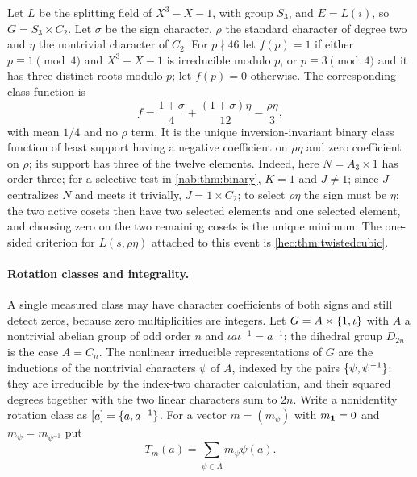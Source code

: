 \begin{example}\label{nab:ex:twisted}
Let $L$ be the splitting field of $X^3-X-1$, with group $S_3$, and $E=L(i)$, so
$G=S_3\times C_2$. Let $\sigma$ be the sign character, $\rho$ the standard character of
degree two and $\eta$ the nontrivial character of $C_2$. For $p\nmid46$ let $f(p)=1$ if
either $p\equiv1\pmod4$ and $X^3-X-1$ is irreducible modulo $p$, or $p\equiv3\pmod4$ and it
has three distinct roots modulo $p$; let $f(p)=0$ otherwise. The corresponding class
function is
\[
 f=\frac{1+\sigma}4+\frac{(1+\sigma)\eta}{12}-\frac{\rho\eta}3 ,
\]
with mean $1/4$ and no $\rho$ term. It is the unique inversion-invariant binary class
function of least support having a negative coefficient on $\rho\eta$ and zero coefficient
on $\rho$; its support has three of the twelve elements. Indeed, here $N=A_3\times1$ has
order three; for a selective test in \cref{nab:thm:binary}, $K=1$ and $J\ne1$; since $J$
centralizes $N$ and meets it trivially, $J=1\times C_2$; to select $\rho\eta$ the sign must
be $\eta$; the two active cosets then have two selected elements and one selected element,
and choosing zero on the two remaining cosets is the unique minimum. The one-sided
criterion for $L(s,\rho\eta)$ attached to this event is \cref{hec:thm:twistedcubic}.
\end{example}

\paragraph{Rotation classes and integrality.}
A single measured class may have character coefficients of both signs and still detect
zeros, because zero multiplicities are integers. Let $G=A\rtimes\{1,\iota\}$ with $A$ a
nontrivial abelian group of odd order $n$ and $\iota a\iota^{-1}=a^{-1}$; the dihedral
group $D_{2n}$ is the case $A=C_n$. The nonlinear irreducible representations of $G$ are
the inductions of the nontrivial characters $\psi$ of $A$, indexed by the pairs
$\{\psi,\psi^{-1}\}$: they are irreducible by the index-two character calculation, and
their squared degrees together with the two linear characters sum to $2n$. Write a
nonidentity rotation class as $[a]=\{a,a^{-1}\}$. For a vector $m=(m_\psi)$ with
$m_{\mathbf{1}}=0$ and $m_\psi=m_{\psi^{-1}}$ put
\[
 T_m(a)=\sum_{\psi\in\widehat A}m_\psi\psi(a) .
\]

